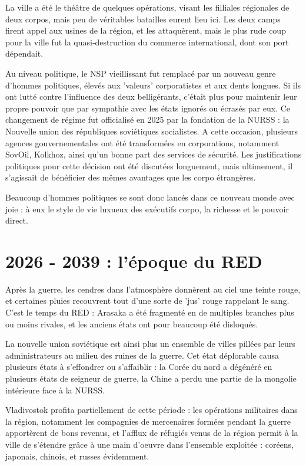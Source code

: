 \documentclass[10pt,a4paper]{book}
\begin{document}
La ville a été le théâtre de quelques opérations, visant les filliales régionales de deux corpos, mais peu de véritables batailles eurent lieu ici. Les deux camps firent appel aux usines de la région, et les attaquèrent, mais le plus rude coup pour la ville fut la quasi-destruction du commerce international, dont son port dépendait.

Au niveau politique, le NSP vieillissant fut remplacé par un nouveau genre d'hommes politiques, élevés aux 'valeurs' corporatistes et aux dents longues. Si ils ont lutté contre l'influence des deux belligérants, c'était plus pour maintenir leur propre pouvoir que par sympathie avec les états ignorés ou écrasés par eux. Ce changement de régime fut officialisé en 2025 par la fondation de la NURSS : la Nouvelle union des républiques soviétiques socialistes. A cette occasion, plusieurs agences gouvernementales ont été transformées en corporations, notamment SovOil, Kolkhoz, ainsi qu'un bonne part des services de sécurité. Les justifications politiques pour cette décision ont été discutées longuement, mais ultimement, il s'agissait de bénéficier des mêmes avantages que les corpo étrangères.

Beaucoup d'hommes politiques se sont donc lancés dans ce nouveau monde avec joie : à eux le style de vie luxueux des exécutifs corpo, la richesse et le pouvoir direct.
\section{2026 - 2039 : l'époque du RED}
Après la guerre, les cendres dans l'atmosphère donnèrent au ciel une teinte rouge, et certaines pluies recouvrent tout d'une sorte de 'jus' rouge rappelant le sang. C'est le temps du RED : Arasaka a été fragmenté en de multiples branches plus ou moins rivales, et les anciens états ont pour beaucoup été disloqués.

La nouvelle union soviétique est ainsi plus un ensemble de villes pillées par leurs administrateurs au milieu des ruines de la guerre. Cet état déplorable causa plusieurs états à s'effondrer ou s'affaiblir : la Corée du nord a dégénéré en plusieurs états de seigneur de guerre, la Chine a perdu une partie de la mongolie intérieure face à la NURSS.

Vladivostok profita partiellement de cette période : les opérations militaires dans la région, notamment les compagnies de mercenaires formées pendant la guerre apportèrent de bons revenus, et l'afflux de réfugiés venus de la région permit à la ville de s'étendre grâce à une main d'oeuvre dans l'ensemble exploitée : coréens, japonais, chinois, et russes évidemment.
\end{document}
